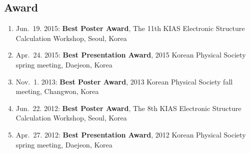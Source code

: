 \hypertarget{award}{%
\subsection{Award}\label{award}}

\begin{enumerate}
\def\labelenumi{\arabic{enumi}.}
\tightlist
\item
  Jun.~19. 2015: \textbf{Best Poster Award}, The 11th KIAS Electronic
  Structure Calculation Workshop, Seoul, Korea
\item
  Apr.~24. 2015: \textbf{Best Presentation Award}, 2015 Korean Physical
  Society spring meeting, Daejeon, Korea
\item
  Nov.~1. 2013: \textbf{Best Poster Award}, 2013 Korean Physical Society
  fall meeting, Changwon, Korea
\item
  Jun.~22. 2012: \textbf{Best Poster Award}, The 8th KIAS Electronic
  Structure Calculation Workshop, Seoul, Korea
\item
  Apr.~27. 2012: \textbf{Best Presentation Award}, 2012 Korean Physical
  Society spring meeting, Daejeon, Korea
\end{enumerate}
